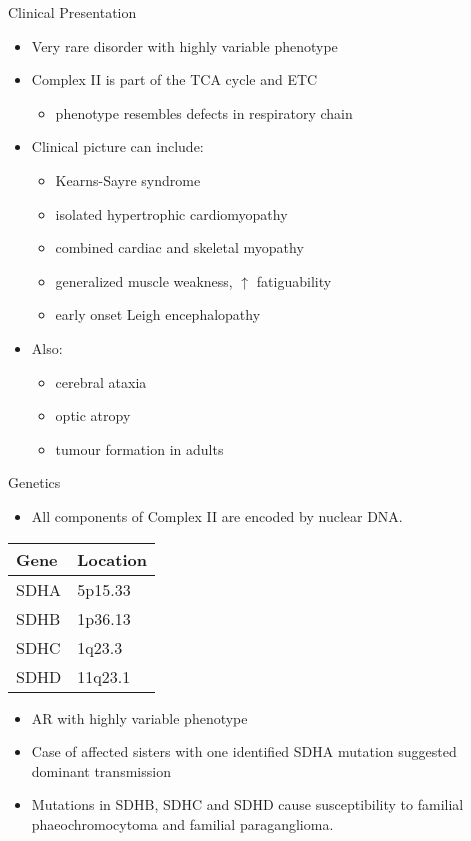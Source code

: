 \documentclass[presentation, smaller]{beamer}
\begin{document}
\begin{frame}[label={sec:org6f9c5e8}]{Clinical Presentation}
\begin{itemize}
\item Very rare disorder with highly variable phenotype
\item Complex II is part of the TCA cycle and ETC
\begin{itemize}
\item phenotype resembles defects in respiratory chain
\end{itemize}
\item Clinical picture can include:
\begin{itemize}
\item Kearns-Sayre syndrome
\item isolated hypertrophic cardiomyopathy
\item combined cardiac and skeletal myopathy
\item generalized muscle weakness, \(\uparrow\) fatiguability
\item early onset Leigh encephalopathy
\end{itemize}
\item Also:
\begin{itemize}
\item cerebral ataxia
\item optic atropy
\item tumour formation in adults
\end{itemize}
\end{itemize}
\end{frame}

\begin{frame}[label={sec:org907ba88}]{Genetics}
\begin{itemize}
\item All components of Complex II are encoded by nuclear DNA.
\end{itemize}

\begin{center}
\begin{tabular}{ll}
Gene & Location\\
\hline
SDHA & 5p15.33\\
SDHB & 1p36.13\\
SDHC & 1q23.3\\
SDHD & 11q23.1\\
\end{tabular}
\end{center}


\begin{itemize}
\item AR with highly variable phenotype
\item Case of affected sisters with one identified SDHA mutation suggested
dominant transmission
\item Mutations in SDHB, SDHC and SDHD cause susceptibility to familial
phaeochromocytoma and familial paraganglioma.
\end{itemize}
\end{frame}
\end{document}
